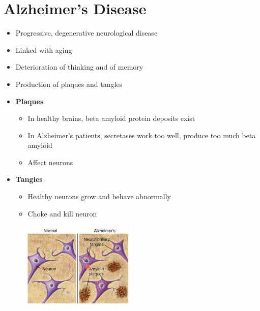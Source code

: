 \documentclass[a4paper,12pt]{article}
\begin{document}
\section{Alzheimer's Disease}
\begin{itemize}
    \item{Progressive, degenerative neurological disease}
    \item{Linked with aging}
    \item{Deterioration of thinking and of memory}
    \item{Production of plaques and tangles}
    \item{
            \textbf{Plaques}
            \begin{itemize}
                \item{In healthy brains, beta amyloid protein deposits exist}
                \item{In Alzheimer's patients, secretases work too well, produce too much beta amyloid}
                \item{Affect neurons}
            \end{itemize}
        }
    \item{
            \textbf{Tangles}
            \begin{itemize}
                \item{Healthy neurons grow and behave abnormally}
                \item{Choke and kill neuron}
            \end{itemize}
        }
\end{itemize}
\begin{figure}[H]
    \centering
    \includegraphics[width=0.50\textwidth]{alz}
\end{figure}
\end{document}
